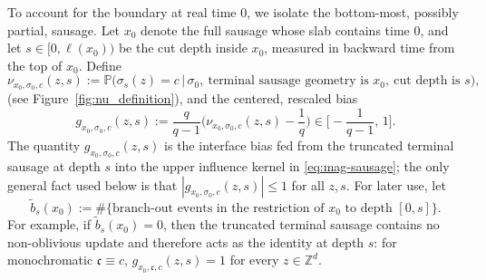 \documentclass[letterpaper,11pt,reqno]{amsart}
\theoremstyle{definition}
\begin{document}
To account for the boundary at real time \(0\), we isolate the bottom-most, possibly partial,
sausage. Let \(x_0\) denote the full sausage whose slab contains time \(0\), and let
\(s\in[0,\ell(x_0))\) be the cut depth inside \(x_0\), measured in backward time from the top of
\(x_0\). Define
\[
\nu_{x_0,\sigma_0,c}(z,s)
:=
\mathbb P\bigl(\sigma_s(z)=c \,\big|\, \sigma_0,\ \text{terminal sausage geometry is }x_0,\ \text{cut depth is }s\bigr),
\]
(see Figure~\ref{fig:nu_definition}), and the centered, rescaled bias
\begin{equation*}
g_{x_0,\sigma_0,c}(z,s):=\frac{q}{q-1}\Big(\nu_{x_0,\sigma_0,c}(z,s)-\frac1q\Big)\in\Big[-\frac1{q-1},\,1\Big].
\end{equation*}
The quantity \(g_{x_0,\sigma_0,c}(z,s)\) is the interface bias fed from the truncated
terminal sausage at depth \(s\) into the upper influence kernel in \eqref{eq:mag-sausage}; the only
general fact used below is that \(|g_{x_0,\sigma_0,c}(z,s)|\le1\) for all \(z,s\). For later
use, let
\[
\tilde b_s(x_0):=\#\{\text{branch-out events in the restriction of }x_0\text{ to depth }[0,s]\}.
\]
For example, if \(\tilde b_s(x_0)=0\), then the truncated terminal sausage contains no non-oblivious update and
therefore acts as the identity at depth \(s\): for monochromatic \(\mathfrak c\equiv c\), $g_{x_0,\mathfrak c,c}(z,s)=1$ for every $z\in\mathbb{Z}^d$.
\end{document}
